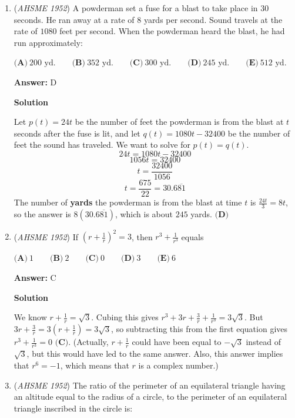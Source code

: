 \begin{enumerate}
 $[BCA]=\frac{12 \cdot 16}{2}=96$, and $[BDE]=\frac{96 \cdot 25}{64}=\frac{75}{2}$.

 $[ADEC]=\frac{192-75}{2}=\boxed{\textbf{(B)}\ 58\frac{1}{2}}$



	\item (\textit{AHSME 1952}) A powderman set a fuse for a blast to take place in $30$ seconds. He ran away at a rate of $8$ yards per second. Sound travels at the rate of $1080$ feet per second. When the powderman heard the blast, he had run approximately:


 $\textbf{(A)}\ \text{200 yd.}\qquad\textbf{(B)}\ \text{352 yd.}\qquad\textbf{(C)}\ \text{300 yd.}\qquad\textbf{(D)}\ \text{245 yd.}\qquad\textbf{(E)}\ \text{512 yd.}$

 \textbf{Answer: }D



\textbf{Solution}

Let $p(t)=24t$ be the number of feet the powderman is from the blast at $t$ seconds after the fuse is lit, and let $q(t)=1080t-32400$ be the number of feet the sound has traveled. We want to solve for $p(t)=q(t)$.
 \[24t=1080t-32400\]
 \[1056t=32400\]
 \[t=\frac{32400}{1056}\]
 \[t=\frac{675}{22}=30.6\overline{81}\]The number of \textbf{yards} the powderman is from the blast at time $t$ is $\frac{24t}3=8t$, so the answer is $8(30.6\overline{81})$, which is about $245$ yards. $\boxed{\textbf{(D)}}$



	\item (\textit{AHSME 1952}) If $\left(r+\frac1r\right)^2=3$, then $r^3+\frac1{r^3}$ equals


 $\textbf{(A)}\ 1\qquad\textbf{(B)}\ 2\qquad\textbf{(C)}\ 0\qquad\textbf{(D)}\ 3\qquad\textbf{(E)}\ 6$

 \textbf{Answer: }C



\textbf{Solution}

We know $r+\frac1r=\sqrt3$. Cubing this gives $r^3+3r+\frac3r+\frac1{r^3}=3\sqrt3$. But $3r+\frac3r=3\left(r+\frac1r\right)=3\sqrt3$, so subtracting this from the first equation gives$r^3+\frac1{r^3}=\boxed{0\textbf{ (C)}}$. (Actually, $r+\frac1r$ could have been equal to $-\sqrt3$ instead of $\sqrt3$, but this would have led to the same answer. Also, this answer implies that $r^6=-1$, which means that $r$ is a complex number.)

 


	\item (\textit{AHSME 1952}) The ratio of the perimeter of an equilateral triangle having an altitude equal to the radius of a circle, to the perimeter of an equilateral triangle inscribed in the circle is:



\end{enumerate}
